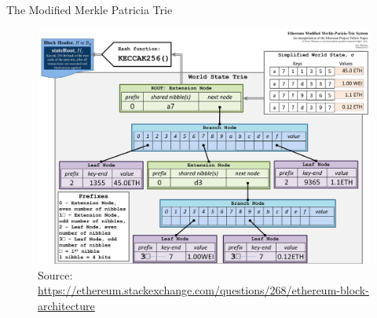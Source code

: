 \documentclass[]{beamer}
\begin{document}
\begin{frame}{The Modified Merkle Patricia Trie}
\vspace{1em}
\captionsetup[figure]{font=tiny,labelformat=empty}
\begin{figure}[htp]
\centering
\includegraphics[scale= 0.5]{../assets/images/modified_merkle_patricia_state_tree.jpg}
      \caption{{\tiny Source: \link \url{https://ethereum.stackexchange.com/questions/268/ethereum-block-architecture}}}\label{fig:2}
\end{figure}

		
\end{frame}
\end{document}
